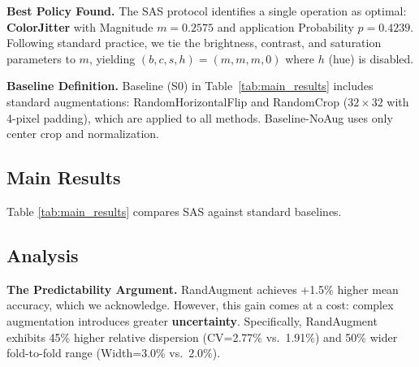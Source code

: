 \documentclass[conference,letterpaper]{IEEEtran}
\begin{document}
\textbf{Best Policy Found.} The SAS protocol identifies a single operation as optimal: \textbf{ColorJitter} with Magnitude $m=0.2575$ and application Probability $p=0.4239$. Following standard practice, we tie the brightness, contrast, and saturation parameters to $m$, yielding $(b,c,s,h)=(m,m,m,0)$ where $h$ (hue) is disabled.

\textbf{Baseline Definition.} Baseline (S0) in Table~\ref{tab:main_results} includes standard augmentations: RandomHorizontalFlip and RandomCrop ($32 \times 32$ with 4-pixel padding), which are applied to all methods. Baseline-NoAug uses only center crop and normalization.

\subsection{Main Results}
Table \ref{tab:main_results} compares SAS against standard baselines.

\begin{table}[htbp]
    \centering
    \caption{Comparison on CIFAR-100 ($\sim$90 samples/class). Results are mean $\pm$ std over 5 disjoint folds; std measures \textit{split sensitivity} (variation across different data partitions). \textbf{CV} = Std/Mean. \textbf{Width} = max $-$ min across folds.}
    \label{tab:main_results}
\end{table}

\subsection{Analysis}
\textbf{The Predictability Argument.} RandAugment achieves +1.5\% higher mean accuracy, which we acknowledge. However, this gain comes at a cost: complex augmentation introduces greater \textbf{uncertainty}. Specifically, RandAugment exhibits 45\% higher relative dispersion (CV=2.77\% vs.\ 1.91\%) and 50\% wider fold-to-fold range (Width=3.0\% vs.\ 2.0\%). 
\end{document}

